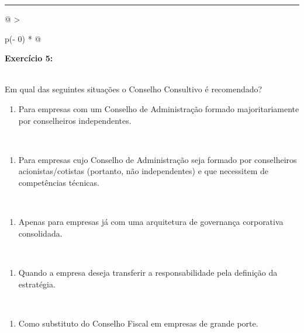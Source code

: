 \documentclass[
]{book}
\providecommand{\tightlist}{%
  \setlength{\itemsep}{0pt}\setlength{\parskip}{0pt}}
\begin{document}
\begin{center}\rule{0.5\linewidth}{0.5pt}\end{center}

\begin{longtable}[]{@{}
  >{\raggedright\arraybackslash}p{(\columnwidth - 0\tabcolsep) * }@{}}
\toprule\noalign{}
\begin{minipage}[b]{\linewidth}\raggedright
\textbf{Exercício 5:}
\end{minipage} \\
\midrule\noalign{}
\endhead
\bottomrule\noalign{}
\endlastfoot
Em qual das seguintes situações o Conselho Consultivo é recomendado? \\
\begin{minipage}[t]{\linewidth}\raggedright
\begin{enumerate}
\def\labelenumi{\alph{enumi})}
\tightlist
\item
  Para empresas com um Conselho de Administração formado majoritariamente por conselheiros independentes.
\end{enumerate}
\end{minipage} \\
\begin{minipage}[t]{\linewidth}\raggedright
\begin{enumerate}
\def\labelenumi{\alph{enumi})}
\setcounter{enumi}{1}
\tightlist
\item
  Para empresas cujo Conselho de Administração seja formado por conselheiros acionistas/cotistas (portanto, não independentes) e que necessitem de competências técnicas.
\end{enumerate}
\end{minipage} \\
\begin{minipage}[t]{\linewidth}\raggedright
\begin{enumerate}
\def\labelenumi{\alph{enumi})}
\setcounter{enumi}{2}
\tightlist
\item
  Apenas para empresas já com uma arquitetura de governança corporativa consolidada.
\end{enumerate}
\end{minipage} \\
\begin{minipage}[t]{\linewidth}\raggedright
\begin{enumerate}
\def\labelenumi{\alph{enumi})}
\setcounter{enumi}{3}
\tightlist
\item
  Quando a empresa deseja transferir a responsabilidade pela definição da estratégia.
\end{enumerate}
\end{minipage} \\
\begin{minipage}[t]{\linewidth}\raggedright
\begin{enumerate}
\def\labelenumi{\alph{enumi})}
\setcounter{enumi}{4}
\tightlist
\item
  Como substituto do Conselho Fiscal em empresas de grande porte.
\end{enumerate}
\end{minipage} \\
\end{longtable}
\end{document}
